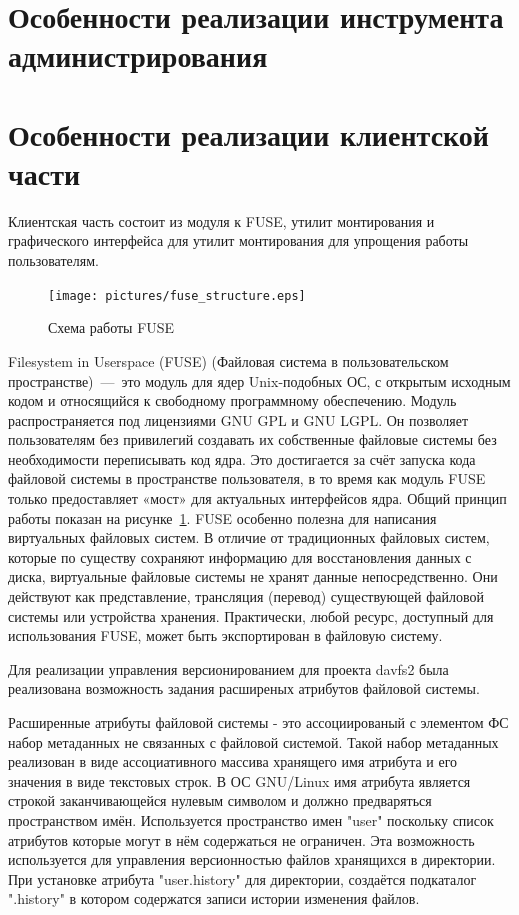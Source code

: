 \documentclass[utf8,usehyperref,12pt]{G7-32}
\begin{document}
\section{Особенности реализации инструмента администрирования}

\section{Особенности реализации клиентской части}
Клиентская часть состоит из модуля к FUSE, утилит монтирования и графического интерфейса для утилит монтирования для упрощения работы пользователям. 

\begin{figure}[ht]
   \centering%
   \texttt{[image: pictures/fuse\_structure.eps]}
   \caption{Схема работы FUSE}\label{fig:fuse_structure}
 \end{figure}

Filesystem in Userspace (FUSE) (Файловая система в пользовательском пространстве)~—~это модуль для ядер Unix-подобных ОС, с открытым исходным кодом и относящийся к свободному программному обеспечению. Модуль распространяется под лицензиями GNU GPL и GNU LGPL. Он позволяет пользователям без привилегий создавать их собственные файловые системы без необходимости переписывать код ядра. Это достигается за счёт запуска кода файловой системы в пространстве пользователя, в то время как модуль FUSE только предоставляет «мост» для актуальных интерфейсов ядра. Общий принцип работы показан на рисунке~\ref{fig:fuse_structure}. FUSE особенно полезна для написания виртуальных файловых систем. В отличие от традиционных файловых систем, которые по существу сохраняют информацию для восстановления данных с диска, виртуальные файловые системы не хранят данные непосредственно. Они действуют как представление, трансляция (перевод) существующей файловой системы или устройства хранения. Практически, любой ресурс, доступный для использования FUSE, может быть экспортирован в файловую систему.

Для реализации управления версионированием для проекта davfs2 была реализована возможность задания расширеных атрибутов файловой системы. 

Расширенные атрибуты файловой системы - это ассоциированый с элементом ФС набор метаданных не связанных с файловой системой. Такой набор метаданных реализован в виде ассоциативного массива хранящего имя атрибута и его значения в виде текстовых строк. В ОС GNU/Linux имя атрибута является строкой заканчивающейся нулевым символом и должно предваряться пространством имён. Используется пространство имен "user" поскольку список атрибутов которые могут в нём содержаться не ограничен. Эта возможность используется для управления версионностью файлов хранящихся в директории. При установке атрибута "user.history" для директории, создаётся подкаталог ".history" в котором содержатся записи истории изменения файлов.
\end{document}
